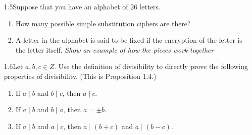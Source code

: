 \begin{exercise}
    {1.5}Suppose that you have an alphabet of 26 letters. 
    \begin{enumerate}
        \item How many possible simple substitution ciphers are there?
        \item A letter in the alphabet is said to be fixed if the encryption of the letter is the letter itself. \textit{Show an example of how the pieces work together}
    \end{enumerate}
\end{exercise}


\begin{exercise}
    {1.6}Let $a, b, c \in Z$. Use the definition of divisibility to directly prove the following properties of divisibility. (This is Proposition 1.4.)
    \begin{enumerate}
        \item If $a \mid b$ and $b \mid c$, then $a \mid c$.
        \item If $a \mid b$ and $b \mid a$, then $a = \pm b$.
        \item If $a \mid b$ and $a \mid c$, then $a \mid (b + c)$ and $a \mid (b - c)$.
    \end{enumerate}
\end{exercise}

